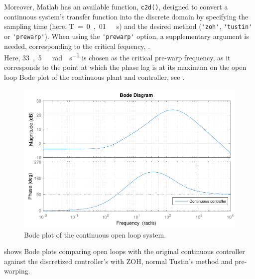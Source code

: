 Moreover, Matlab has an available function, \lstinline[style=custommatlabinline]{c2d()}, designed to convert a continuous system's transfer function into the discrete domain by specifying the sampling time (here, \si{T = 0,01\ s}) and the desired method (\lstinline[style=custommatlabinline]{'zoh'}, \lstinline[style=custommatlabinline]{'tustin'} or \lstinline[style=custommatlabinline]{'prewarp'}). When using the \lstinline[style=custommatlabinline]{'prewarp'} option, a supplementary argument is needed, corresponding to the critical fequency, \cite{Matlabc2d}.\\
Here, \si{33,5\ rad \cdot s^{-1}} is chosen as the critical pre-warp frequency, as it corresponds to the point at which the phase lag is at its maximum on the open loop Bode plot of the continuous plant and controller, see .
%
\begin{figure}[H]
  \centering
  \includegraphics[scale=0.6]{figures/openLoopBadSISOController}
  \caption{Bode plot of the continuous open loop system.}
  \label{fig:bodeOpenLoopContinuous}
\end{figure}\vspace{-18pt}
 shows Bode plots comparing open loops with the original continuous controller against the discretized controller's with ZOH, normal Tustin's method and pre-warping.
%
